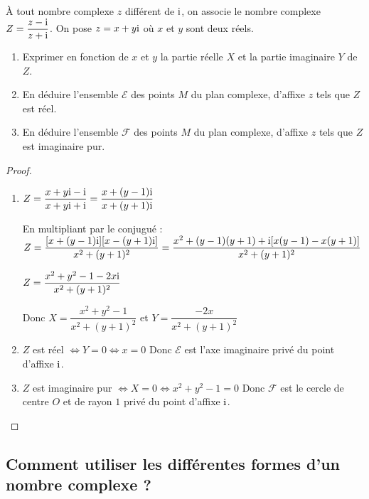 \begin{example}
À tout nombre complexe $z$ différent de $\text{i}$, on associe le nombre complexe $Z = \dfrac{z-\text{i}}{z+\text{i}}$. On pose $z = x + y\text{i}$ où $x$ et $y$ sont deux réels.

\begin{enumerate}
\item Exprimer en fonction de $x$ et $y$ la partie réelle $X$ et la partie imaginaire $Y$ de $Z$.
\item En déduire l'ensemble $\mathcal{E}$ des points $M$ du plan complexe, d'affixe $z$ tels que $Z$ est réel.
\item En déduire l'ensemble $\mathcal{F}$ des points $M$ du plan complexe, d'affixe $z$ tels que $Z$ est imaginaire pur.
\end{enumerate}

\begin{proof}
\begin{enumerate}
\item $Z = \dfrac{x + y\text{i} - \text{i}}{x + y\text{i} + \text{i}} = \dfrac{x + (y-1)\text{i}}{x + (y+1)\text{i}}$

En multipliant par le conjugué :
$Z = \dfrac{[x + (y-1)\text{i}][x - (y+1)\text{i}]}{x^2 + (y+1)^2} = \dfrac{x^2 + (y-1)(y+1) + \text{i}[x(y-1) - x(y+1)]}{x^2 + (y+1)^2}$

$Z = \dfrac{x^2 + y^2 - 1 - 2x\text{i}}{x^2 + (y+1)^2}$

Donc $X = \dfrac{x^2 + y^2 - 1}{x^2 + (y+1)^2}$ et $Y = \dfrac{-2x}{x^2 + (y+1)^2}$

\item $Z$ est réel $\Leftrightarrow Y = 0 \Leftrightarrow x = 0$
Donc $\mathcal{E}$ est l'axe imaginaire privé du point d'affixe $\text{i}$.

\item $Z$ est imaginaire pur $\Leftrightarrow X = 0 \Leftrightarrow x^2 + y^2 - 1 = 0$
Donc $\mathcal{F}$ est le cercle de centre $O$ et de rayon $1$ privé du point d'affixe $\text{i}$.
\end{enumerate}
\end{proof}
\end{example}

\subsection{Comment utiliser les différentes formes d'un nombre complexe ?}

